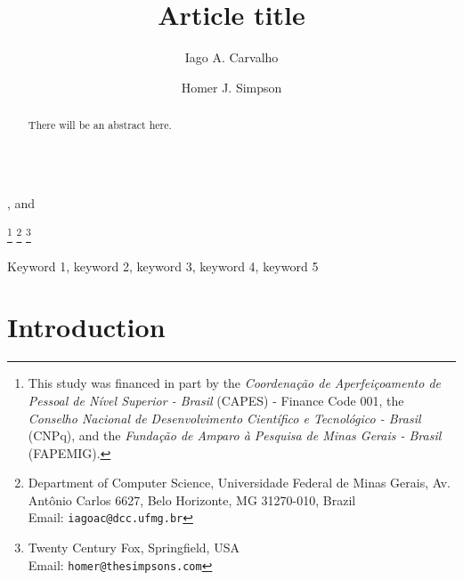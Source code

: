 \documentclass{endm}
\begin{document}
\begin{verbatim}\end{verbatim}\vspace{2.5cm}

\begin{frontmatter}

\title{Article title}

\author{Iago A. Carvalho}, and
\author{Homer J. Simpson}


\thanks[all]{This study was financed in part by the \emph{Coordenação de Aperfeiçoamento de Pessoal de Nível Superior - Brasil} (CAPES) - Finance Code 001, the \emph{Conselho Nacional de Desenvolvimento Científico e Tecnológico - Brasil} (CNPq), and the \emph{Fundação de Amparo à Pesquisa de Minas Gerais - Brasil} (FAPEMIG).}
\thanks[ufmg]{Department of Computer Science, Universidade Federal de Minas Gerais, Av. Antônio Carlos 6627, Belo Horizonte, MG 31270-010, Brazil \\Email: \texttt{\normalshape iagoac@dcc.ufmg.br}}
\thanks[fox]{Twenty Century Fox, Springfield, USA \\ Email:
\texttt{\normalshape homer@thesimpsons.com}}

\begin{abstract}
There will be an abstract here.
\end{abstract}

\begin{keyword}
Keyword 1, keyword 2, keyword 3, keyword 4, keyword 5
\end{keyword}

\end{frontmatter}

\section{Introduction}\label{sec:intro}



\end{document}
